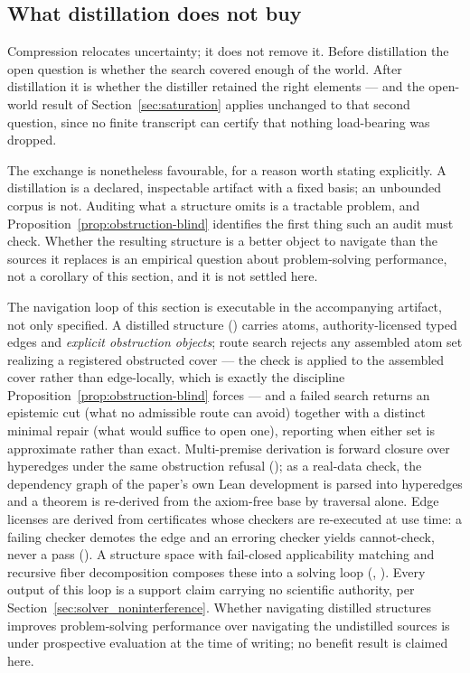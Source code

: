 \subsection{What distillation does not buy}

Compression relocates uncertainty; it does not remove it. Before distillation the open question is whether the search covered enough of the world. After distillation it is whether the distiller retained the right elements --- and the open-world result of Section~\ref{sec:saturation} applies unchanged to that second question, since no finite transcript can certify that nothing load-bearing was dropped.

The exchange is nonetheless favourable, for a reason worth stating explicitly. A distillation is a declared, inspectable artifact with a fixed basis; an unbounded corpus is not. Auditing what a structure omits is a tractable problem, and Proposition~\ref{prop:obstruction-blind} identifies the first thing such an audit must check. Whether the resulting structure is a better object to navigate than the sources it replaces is an empirical question about problem-solving performance, not a corollary of this section, and it is not settled here.

\begin{remark}[Implementation]
The navigation loop of this section is executable in the accompanying artifact, not only specified. A distilled structure () carries atoms, authority-licensed typed edges and \emph{explicit obstruction objects}; route search rejects any assembled atom set realizing a registered obstructed cover --- the check is applied to the assembled cover rather than edge-locally, which is exactly the discipline Proposition~\ref{prop:obstruction-blind} forces --- and a failed search returns an epistemic cut (what no admissible route can avoid) together with a distinct minimal repair (what would suffice to open one), reporting when either set is approximate rather than exact. Multi-premise derivation is forward closure over hyperedges under the same obstruction refusal (); as a real-data check, the dependency graph of the paper's own Lean development is parsed into hyperedges and a theorem is re-derived from the axiom-free base by traversal alone. Edge licenses are derived from certificates whose checkers are re-executed at use time: a failing checker demotes the edge and an erroring checker yields cannot-check, never a pass (). A structure space with fail-closed applicability matching and recursive fiber decomposition composes these into a solving loop (, ). Every output of this loop is a support claim carrying no scientific authority, per Section~\ref{sec:solver_noninterference}. Whether navigating distilled structures improves problem-solving performance over navigating the undistilled sources is under prospective evaluation at the time of writing; no benefit result is claimed here.
\end{remark}
